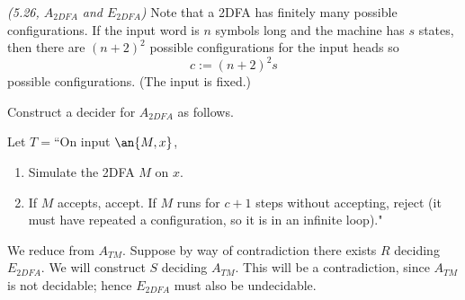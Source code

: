 \pagebreak

\begin{problem}{\it(5.26, $A_{2DFA}$ and $E_{2DFA}$)}
Note that a 2DFA has finitely many possible configurations. If the input word is $n$ symbols long and the machine has $s$ states, then there are $(n+2)^2$ possible configurations for the input heads so 
\[
c:=(n+2)^2s
\]
possible configurations. (The input is fixed.)

Construct a decider for $A_{2DFA}$ as follows.

Let $T=$``On input $\an{M,x}$,
\begin{enumerate}
\item
Simulate the 2DFA $M$ on $x$. 
\item
If $M$ accepts, accept. If $M$ runs for $c+1$ steps without accepting, reject (it must have repeated a configuration, so it is in an infinite loop)."
\end{enumerate}

We reduce from $A_{TM}$. Suppose by way of contradiction there exists $R$ deciding $E_{2DFA}$. We will construct $S$ deciding $A_{TM}$. This will be a contradiction, since $A_{TM}$ is not decidable; hence $E_{2DFA}$ must also be undecidable.


\end{problem}
